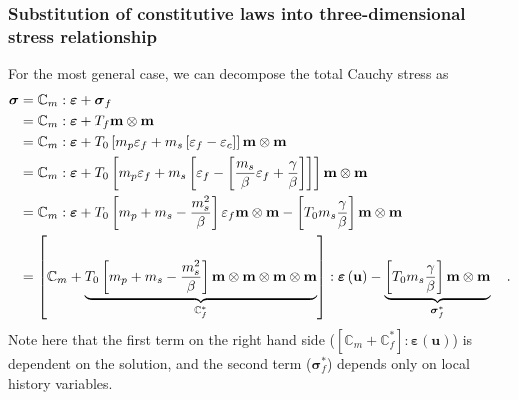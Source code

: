 \documentclass[]{scrartcl}
\begin{document}
\subsubsection*{Substitution of constitutive laws into three-dimensional stress relationship}
For the most general case, we can decompose the total Cauchy stress as
\begin{align}
\boldsymbol{\sigma}
  &= \boldsymbol{\mathbb{C}}_{m} : \boldsymbol{\varepsilon} + \boldsymbol{\sigma}_{f} \notag\\
  &= \boldsymbol{\mathbb{C}}_{m} : \boldsymbol{\varepsilon} + T_{f} \mathbf{m} \otimes \mathbf{m} \notag\\
  &= \boldsymbol{\mathbb{C}}_{m} : \boldsymbol{\varepsilon} + T_{0} \left[ m_{p} \varepsilon_{f} + m_{s} \left[ \varepsilon_{f} - \varepsilon_{c} \right] \right] \mathbf{m} \otimes \mathbf{m} \notag\\
  &= \boldsymbol{\mathbb{C}}_{m} : \boldsymbol{\varepsilon} + T_{0} \left[ m_{p} \varepsilon_{f} + m_{s} \left[ \varepsilon_{f} - \left[ \frac{m_{s}}{\beta} \varepsilon_{f} + \frac{\gamma}{\beta} \right] \right] \right] \mathbf{m} \otimes \mathbf{m} \notag\\
  &= \boldsymbol{\mathbb{C}}_{m} : \boldsymbol{\varepsilon} + T_{0} \left[ m_{p} +  m_{s}  - \frac{m_{s}^{2}}{\beta} \right] \varepsilon_{f} \mathbf{m} \otimes \mathbf{m} - \left[ T_{0} m_{s} \frac{\gamma}{\beta} \right] \mathbf{m} \otimes \mathbf{m} \notag\\
  &= \left[ \boldsymbol{\mathbb{C}}_{m} + \underbrace{T_{0} \left[ m_{p} +  m_{s}  - \frac{m_{s}^{2}}{\beta} \right] \mathbf{m} \otimes \mathbf{m} \otimes \mathbf{m} \otimes \mathbf{m} }_{\boldsymbol{\mathbb{C}}_{f}^{\ast}} \right] : \boldsymbol{\varepsilon} \left( \mathbf{u} \right) - \underbrace{\left[ T_{0} m_{s} \frac{\gamma}{\beta} \right] \mathbf{m} \otimes \mathbf{m}}_{\boldsymbol{\sigma}_{f}^{\ast}}
\quad .
\label{equ: Full expansion of constitutive laws}
\end{align}
Note here that the first term on the right hand side ($\left[ \boldsymbol{\mathbb{C}}_{m} + \boldsymbol{\mathbb{C}}_{f}^{\ast} \right] : \boldsymbol{\varepsilon} \left( \mathbf{u} \right)$) is dependent on the solution, and the second term ($\boldsymbol{\sigma}_{f}^{\ast}$) depends only on local history variables.
\end{document}
